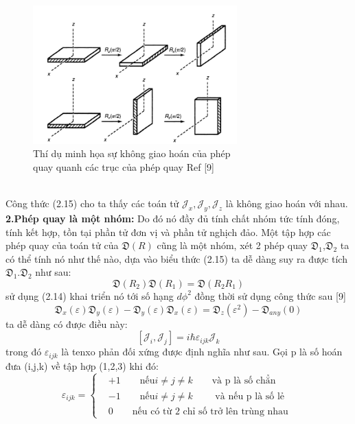   \begin{figure}[hc]
  \centering
  \includegraphics[width=0.70\textwidth]{./Figures/rota.png}
  \caption[sự không giao hoán của phép quay]{Thí dụ minh họa sự không giao hoán của phép\\ quay quanh các trục của phép quay Ref [9] }
  \label{fig:sự không giao hoán của phép quay}
  \end{figure}\\
 Công thức (2.15) cho ta thấy các toán tử $\mathcal{J}_x,\mathcal{J}_y,\mathcal{J}_z$ là không giao hoán với nhau.\\
  \textbf{2.Phép quay là một nhóm:} Do đó nó đầy đủ tính chất nhóm tức tính đóng, tính kết hợp, tồn tại phần tử đơn vị và phần tử nghịch đảo. Một tập hợp các phép quay của toán tử của $\mathfrak{D}(R)$ cũng là một nhóm, xét 2 phép quay $\mathfrak{D}_1$,$\mathfrak{D}_2$ ta có thể tính nó như thế nào, dựa vào biểu thức (2.15) ta dễ dàng suy ra được tích $\mathfrak{D}_1 .\mathfrak{D}_2$ như sau:
  \begin{equation}
  \mathfrak{D}(R_2)\mathfrak{D}(R_1)=\mathfrak{D}(R_2 R_1)
  \end{equation} 
  sử dụng (2.14) khai triển nó tới số hạng $d\phi^2$ đồng thời sử dụng công thức sau [9]
  \begin{equation}
  \mathfrak{D}_x(\varepsilon)\mathfrak{D}_y(\varepsilon) -\mathfrak{D}_y(\varepsilon)\mathfrak{D}_x(\varepsilon) =\mathfrak{D}_z(\varepsilon^2)- \mathfrak{D}_{any}(0)
  \end{equation}
  ta dễ dàng có được điều này:
  \begin{equation}
  \left[ \mathcal{J}_i,\mathcal{J}_j\right] = i\hbar\varepsilon_{ijk}\mathcal{J}_k
  \end{equation}
  trong đó $\varepsilon_{ijk}$ là tenxo phản đối xứng được định nghĩa như sau. Gọi p là số hoán đưa (i,j,k) về tập hợp (1,2,3) khi đó:
  \begin{equation}
  \varepsilon_{ijk}=\begin{cases}
  &+1 \qquad \text{nếu} i\neq j\neq k \qquad \text{và p là số chẳn}\\
  &-1 \qquad \text{nếu} i\neq j\neq k \qquad \text{ và nếu p là số lẻ}\\
  & 0 \qquad \text{nếu có từ 2 chỉ số trở lên trùng nhau }
  \end{cases}
  \end{equation}
